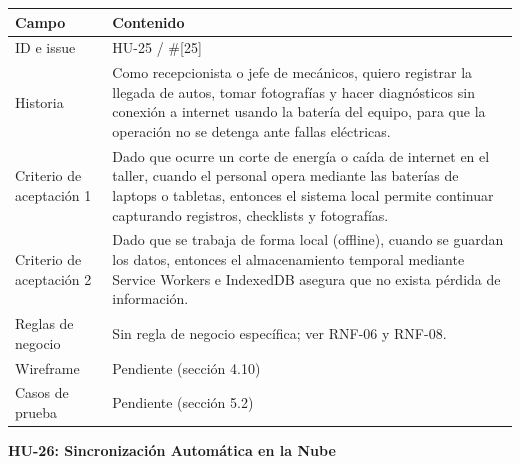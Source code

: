 {\def\LTcaptype{none} %
\begin{longtable}[]{@{}
  >{\raggedright\arraybackslash}p{}
  >{\raggedright\arraybackslash}p{}@{}}
\toprule\noalign{}
\begin{minipage}[b]{\linewidth}\raggedright
\textbf{Campo}
\end{minipage} & \begin{minipage}[b]{\linewidth}\raggedright
\textbf{Contenido}
\end{minipage} \\
\midrule\noalign{}
\endhead
\bottomrule\noalign{}
\endlastfoot
ID e issue & HU-25 / \#{[}25{]} \\
Historia & Como recepcionista o jefe de mecánicos, quiero registrar la
llegada de autos, tomar fotografías y hacer diagnósticos sin conexión a
internet usando la batería del equipo, para que la operación no se
detenga ante fallas eléctricas. \\
Criterio de aceptación 1 & Dado que ocurre un corte de energía o caída
de internet en el taller, cuando el personal opera mediante las baterías
de laptops o tabletas, entonces el sistema local permite continuar
capturando registros, checklists y fotografías. \\
Criterio de aceptación 2 & Dado que se trabaja de forma local (offline),
cuando se guardan los datos, entonces el almacenamiento temporal
mediante Service Workers e IndexedDB asegura que no exista pérdida de
información. \\
Reglas de negocio & Sin regla de negocio específica; ver RNF-06 y
RNF-08. \\
Wireframe & Pendiente (sección 4.10) \\
Casos de prueba & Pendiente (sección 5.2) \\
\end{longtable}
}

\textbf{HU-26: Sincronización Automática en la Nube}

